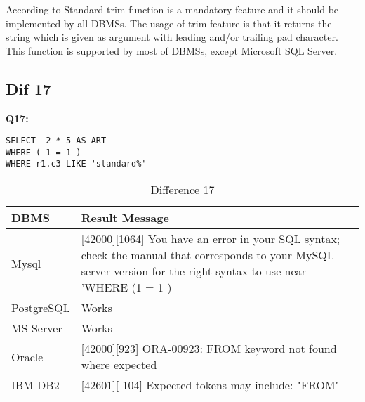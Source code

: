 \hfill\newpage
According to Standard trim function is a mandatory feature and it should be implemented by all DBMSs. The usage of trim feature is that it returns the string which is given as argument with leading and/or trailing pad character. This function is supported by most of DBMSs, except Microsoft SQL Server. 


\subsection{Dif 17}

\textbf{Q17:}
\begin{mdframed}[backgroundcolor=lightgray!20]
\begin{lstlisting}[style=SQL]
SELECT  2 * 5 AS ART
WHERE ( 1 = 1 )
WHERE r1.c3 LIKE 'standard%'
\end{lstlisting}
\end{mdframed}


\begin{table}[h]
\centering
\caption{Difference 17}
\label{my-label}
\begin{tabular}{|p{2cm}|p{11.5cm}| }
\hline
\textbf{DBMS} & \textbf{Result Message}                                                                                                                                                     \\ \hline
Mysql         & {[}42000{]}{[}1064{]} You have an error in your SQL syntax; check the manual that corresponds to your MySQL server version for the right syntax to use near 'WHERE (1 = 1 ) \\ \hline
PostgreSQL    & Works                                                                                                                                                                       \\ \hline
MS Server     & Works                                                                                                                                                                       \\ \hline
Oracle        & {[}42000{]}{[}923{]} ORA-00923: FROM keyword not found where expected                                                                                                       \\ \hline
IBM DB2       & {[}42601{]}{[}-104{]} Expected tokens may include: "FROM"                                                                                                                   \\ \hline
\end{tabular}
\end{table}

